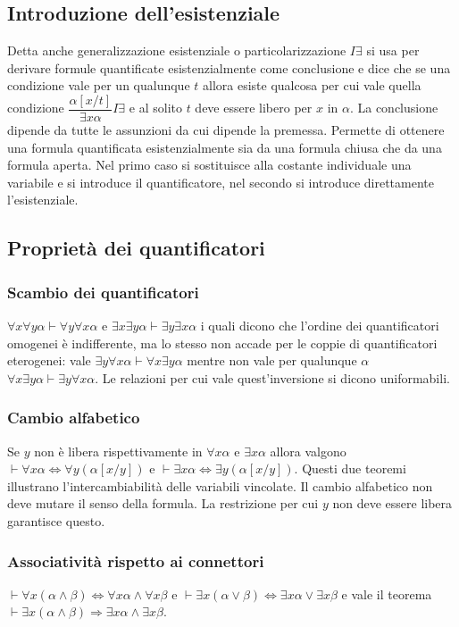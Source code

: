 \subsection{Introduzione dell'esistenziale}
Detta anche generalizzazione esistenziale o particolarizzazione $I\exists$ si usa per derivare formule quantificate esistenzialmente come conclusione e dice che se una condizione vale per un qualunque $t$ 
allora esiste qualcosa per cui vale quella condizione $\dfrac{\alpha[x/t]}{\exists x\alpha}I\exists$ e al solito $t$ deve essere libero per $x$ in $\alpha$. La conclusione dipende da tutte le assunzioni da cui 
dipende la premessa. Permette di ottenere una formula quantificata esistenzialmente sia da una formula chiusa che da una formula aperta. Nel primo caso si sostituisce alla costante individuale una 
variabile e si introduce il quantificatore, nel secondo si introduce direttamente l'esistenziale. 
\subsection{Propriet\`a dei quantificatori}
\subsubsection{Scambio dei quantificatori}
$\forall x\forall y\alpha\vdash\forall y\forall x\alpha$ e $\exists x\exists y\alpha\vdash\exists y\exists x\alpha$ i quali dicono che l'ordine dei quantificatori omogenei \`e indifferente, ma lo stesso non accade per 
le coppie di quantificatori eterogenei: vale $\exists y\forall x\alpha\vdash\forall x \exists y\alpha$ mentre non vale per qualunque $\alpha$ $\forall x\exists y\alpha\vdash \exists y\forall x\alpha$. Le relazioni 
per cui vale quest'inversione si dicono uniformabili.
\subsubsection{Cambio alfabetico}
Se $y$ non \`e libera rispettivamente in $\forall x\alpha$ e $\exists x\alpha$ allora valgono $\vdash\forall x\alpha\Leftrightarrow\forall y(\alpha[x/y])$ e $\vdash\exists x\alpha\Leftrightarrow\exists y(\alpha[x/
y])$. Questi due teoremi illustrano l'intercambiabilit\`a delle variabili vincolate. Il cambio alfabetico non deve mutare il senso della formula. La restrizione per cui $y$ non deve essere libera garantisce questo. 
\subsubsection{Associativit\`a rispetto ai connettori}
$\vdash\forall x(\alpha\land\beta)\Leftrightarrow\forall x\alpha\land\forall x\beta$ e $\vdash\exists x(\alpha\lor\beta)\Leftrightarrow\exists x\alpha\lor\exists x\beta$ e vale il teorema $\vdash\exists 
x(\alpha\land\beta)\Rightarrow\exists x\alpha\land\exists x\beta$.

